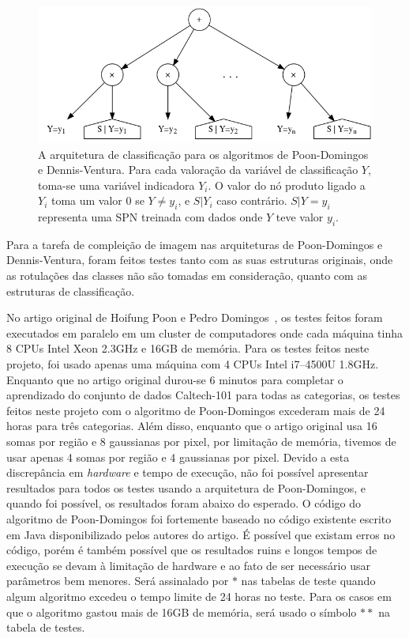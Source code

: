 \documentclass[12pt]{article}
\theoremstyle{plain}
\numberwithin{equation}{section}
\begin{document}
\begin{figure}[h]
  \centering\includegraphics[scale=0.55]{graphs/classarch.png}
  \captionsetup{justification=raggedright}
  \caption{A arquitetura de classificação para os algoritmos de Poon-Domingos e Dennis-Ventura.
    Para cada valoração da variável de classificação $Y$, toma-se uma variável indicadora $Y_i$.
    O valor do nó produto ligado a $Y_i$ toma um valor 0 se $Y\neq y_i$, e $S|Y_i$ caso contrário.
    $S|Y=y_i$ representa uma SPN treinada com dados onde $Y$ teve valor $y_i$.}
\end{figure}

Para a tarefa de compleição de imagem nas arquiteturas de Poon-Domingos e Dennis-Ventura, foram
feitos testes tanto com as suas estruturas originais, onde as rotulações das classes não são
tomadas em consideração, quanto com as estruturas de classificação.

No artigo original de Hoifung Poon e Pedro Domingos~\cite{poon-domingos}, os testes feitos foram
executados em paralelo em um cluster de computadores onde cada máquina tinha 8 CPUs Intel Xeon
2.3GHz e 16GB de memória. Para os testes feitos neste projeto, foi usado apenas uma máquina com 4
CPUs Intel i7--4500U 1.8GHz. Enquanto que no artigo original durou-se 6 minutos para completar o
aprendizado do conjunto de dados Caltech-101 para todas as categorias, os testes feitos neste
projeto com o algoritmo de Poon-Domingos excederam mais de 24 horas para três categorias. Além
disso, enquanto que o artigo original usa 16 somas por região e 8 gaussianas por pixel, por
limitação de memória, tivemos de usar apenas 4 somas por região e 4 gaussianas por pixel. Devido a
esta discrepância em \textit{hardware} e tempo de execução, não foi possível apresentar resultados
para todos os testes usando a arquitetura de Poon-Domingos, e quando foi possível, os resultados
foram abaixo do esperado. O código do algoritmo de Poon-Domingos foi fortemente baseado no código
existente escrito em Java disponibilizado pelos autores do artigo. É possível que existam erros no
código, porém é também possível que os resultados ruins e longos tempos de execução se devam à
limitação de hardware e ao fato de ser necessário usar parâmetros bem menores. Será assinalado por
$\ast$ nas tabelas de teste quando algum algoritmo excedeu o tempo limite de 24 horas no teste.
Para os casos em que o algoritmo gastou mais de 16GB de memória, será usado o símbolo $\ast\ast$ na
tabela de testes.
\end{document}
